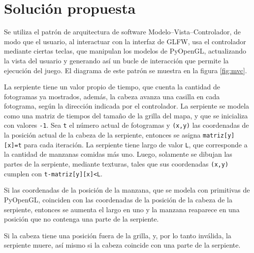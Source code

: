 \section{Solución propuesta}

Se utiliza el patrón de arquitectura de software Modelo--Vista--Controlador, de modo que el usuario, al interactuar con la interfaz de GLFW, usa el controlador mediante ciertas teclas, que manipulan los modelos de PyOpenGL, actualizando la vista del usuario y generando así un bucle de interacción que permite la ejecución del juego. El diagrama de este patrón se muestra en la figura \ref{fig:mvc}.

La serpiente tiene un valor propio de tiempo, que cuenta la cantidad de fotogramas ya mostrados, además, la cabeza avanza una casilla en cada fotograma, según la dirección indicada por el controlador. La serpiente se modela como una matriz de tiempos del tamaño de la grilla del mapa, y que se inicializa con valores \texttt{-1}. Sea \texttt{t} el número actual de fotogramas y \texttt{(x,y)} las coordenadas de la posición actual de la cabeza de la serpiente, entonces se asigna \texttt{matriz[y][x]=t} para cada iteración. La serpiente tiene largo de valor \texttt{L}, que corresponde a la cantidad de manzanas comidas más uno. Luego, solamente se dibujan las partes de la serpiente, mediante texturas, tales que sus coordenadas \texttt{(x,y)} cumplen con \texttt{t-matriz[y][x]<L}.

Si las coordenadas de la posición de la manzana, que se modela con primitivas de PyOpenGL, coinciden con las coordenadas de la posición de la cabeza de la serpiente, entonces se aumenta el largo en uno y la manzana reaparece en una posición que no contenga una parte de la serpiente.

Si la cabeza tiene una posición fuera de la grilla, y, por lo tanto inválida, la serpiente muere, así mismo si la cabeza coincide con una parte de la serpiente.

